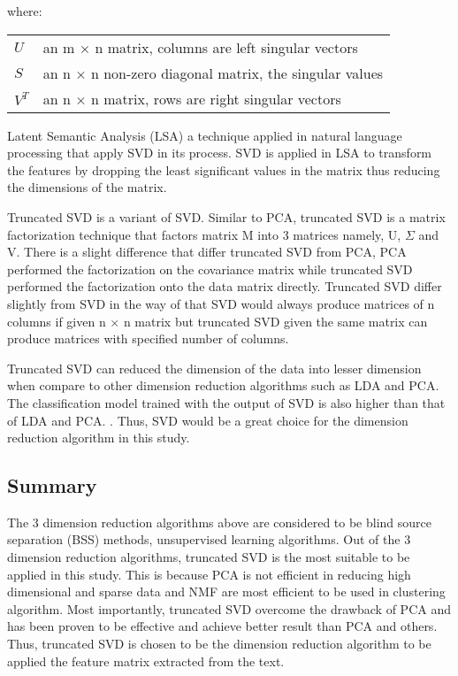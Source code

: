 where:
\begin{center}
	\begin{tabular}{l @{ $=$ } l}
		$U$ & an m $\times$ n matrix, columns are left singular vectors \\
		$S$ & an n $\times$ n non-zero diagonal matrix, the singular values \\
		$V^{T}$ & an n $\times$ n matrix, rows are right singular vectors \\
	\end{tabular}
\end{center}

	
Latent Semantic Analysis (LSA) a technique applied in natural language processing that apply SVD in its process. SVD is applied in LSA to transform the features by dropping the least significant values in the matrix thus reducing the dimensions of the matrix. \cite{fuzzyLash}

Truncated SVD is a variant of SVD. Similar to PCA, truncated SVD is a matrix factorization technique that factors matrix M into 3 matrices namely, U, $\Sigma$ and V. There is a slight difference that differ truncated SVD from PCA, PCA performed the factorization on the covariance matrix while truncated SVD performed the factorization onto the data matrix directly. Truncated SVD differ slightly from SVD in the way of that SVD would always produce matrices of n columns if given n $\times$ n matrix but truncated SVD given the same matrix can produce matrices with specified number of columns. \cite{truncatedSVD}

Truncated SVD can reduced the dimension of the data into lesser dimension when compare to other dimension reduction algorithms such as LDA and PCA. The classification model trained with the output of SVD is also higher than that of LDA and PCA. \cite{dimRedCat}. Thus, SVD would be a great choice for the dimension reduction algorithm in this study.\\
	
\subsection{Summary}
The 3 dimension reduction algorithms above are considered to be blind source separation (BSS) methods, unsupervised learning algorithms. Out of the 3 dimension reduction algorithms, truncated SVD is the most suitable to be applied in this study. This is because PCA is not efficient in reducing high dimensional and sparse data and NMF are most efficient to be used in clustering algorithm. Most importantly, truncated SVD overcome the drawback of PCA and has been proven to be effective and achieve better result than PCA and others. Thus, truncated SVD is chosen to be the dimension reduction algorithm to be applied the feature matrix extracted from the text.\\

